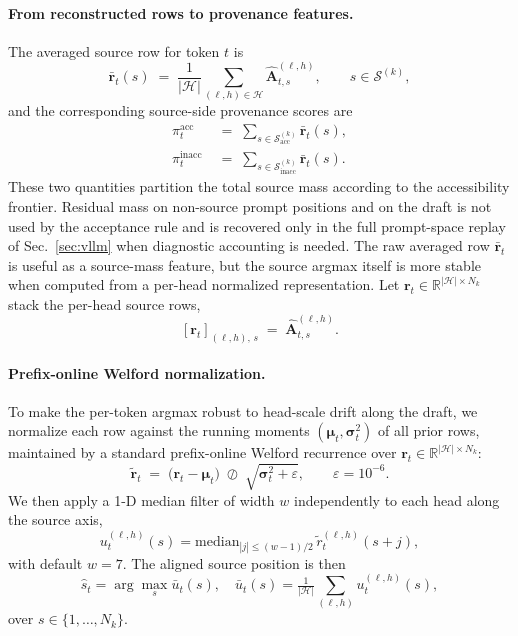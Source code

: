 \documentclass[11pt,twocolumn]{article}
\begin{document}
\paragraph{From reconstructed rows to provenance features.}
The averaged source row for token $t$ is
\begin{equation}
  \bar{\mathbf{r}}_t(s) \;=\; \frac{1}{|\mathcal{H}|} \sum_{(\ell,h) \in \mathcal{H}}
  \widehat{\mathbf{A}}^{(\ell,h)}_{t,s},
  \qquad s \in \mathcal{S}^{(k)},
  \label{eq:rowbar}
\end{equation}
and the corresponding source-side provenance scores are
\begin{align}
  \pi_t^{\mathrm{acc}}
  &\;=\;
  \sum_{s \in \mathcal{S}^{(k)}_{\mathrm{acc}}} \bar{\mathbf{r}}_t(s),
  \label{eq:prov-acc}\\
  \pi_t^{\mathrm{inacc}}
  &\;=\;
  \sum_{s \in \mathcal{S}^{(k)}_{\mathrm{inacc}}} \bar{\mathbf{r}}_t(s).
  \label{eq:provenance}
\end{align}
These two quantities partition the total source mass according to the
accessibility frontier. Residual mass on non-source prompt positions and on the
draft is not used by the acceptance rule and is recovered only in the full
prompt-space replay of Sec.~\ref{sec:vllm} when diagnostic accounting is
needed.
The raw averaged row $\bar{\mathbf{r}}_t$ is useful as a source-mass feature,
but the source argmax itself is more stable when computed from a
per-head normalized representation. Let
$\mathbf{r}_t \in \mathbb{R}^{|\mathcal{H}| \times N_k}$ stack the
per-head source rows,
\[
  [\mathbf{r}_t]_{(\ell,h),\, s}
  \;=\;
  \widehat{\mathbf{A}}^{(\ell,h)}_{t,s}.
\]

\paragraph{Prefix-online Welford normalization.}
To make the per-token argmax robust to head-scale drift along the draft, we
normalize each row against the running moments
$(\boldsymbol{\mu}_t, \boldsymbol{\sigma}^2_t)$ of all prior rows,
maintained by a standard prefix-online Welford recurrence over
$\mathbf{r}_t \in \mathbb{R}^{|\mathcal{H}| \times N_k}$:
\begin{equation}
  \tilde{\mathbf{r}}_t \;=\;
  \bigl(\mathbf{r}_t - \boldsymbol{\mu}_t\bigr) \;\oslash\;
  \sqrt{\boldsymbol{\sigma}^2_t + \varepsilon},
  \qquad \varepsilon = 10^{-6}.
  \label{eq:welford-norm}
\end{equation}
We then apply a 1-D median filter of width $w$ independently to each head along
the source axis,
\begin{equation}
  u_t^{(\ell,h)}(s) =
  \mathrm{median}_{|j| \le (w-1)/2}\, \tilde{r}_t^{(\ell,h)}(s+j),
  \label{eq:medfilt}
\end{equation}
with default $w = 7$. The aligned source position is then
\begin{equation}
  \hat{s}_t = \arg\max_{s} \bar{u}_t(s),
  \quad
  \bar{u}_t(s) = \tfrac{1}{|\mathcal{H}|} \sum_{(\ell,h)} u_t^{(\ell,h)}(s),
  \label{eq:argmax}
\end{equation}
over $s \in \{1,\ldots,N_k\}$.
\end{document}
